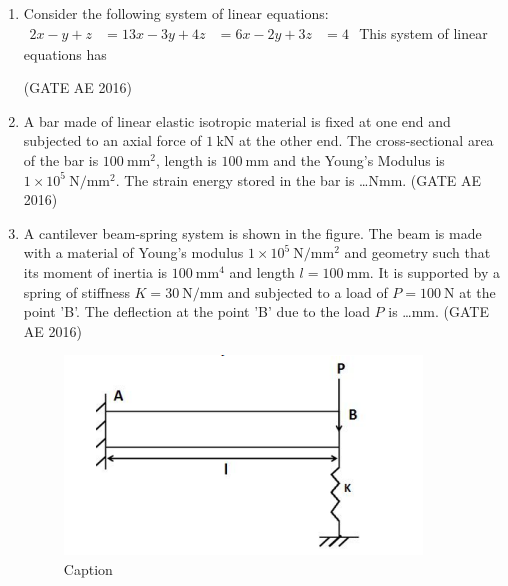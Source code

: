 \documentclass[journal,12pt,onecolumn]{IEEEtran}
\theoremstyle{remark}
\begin{document}
\begin{enumerate}
\item Consider the following system of linear equations:
$
\begin{aligned}
2x - y + z &= 1 
3x - 3y + 4z &= 6 
x - 2y + 3z &= 4
\end{aligned}
$
This system of linear equations has
\begin{enumerate}
\end{enumerate}
\hfill(GATE AE 2016)



\item A bar made of linear elastic isotropic material is fixed at one end and subjected to an axial force of $1~\mathrm{kN}$ at the other end. The cross-sectional area of the bar is $100~\mathrm{mm^2}$, length is $100~\mathrm{mm}$ and the Young's Modulus is $1 \times 10^5~\mathrm{N/mm^2}$. The strain energy stored in the bar is \dots Nmm.
\hfill(GATE AE 2016)



\item A cantilever beam-spring system is shown in the figure. The beam is made with a material of Young's modulus $1\times10^5~\mathrm{N/mm^2}$ and geometry such that its moment of inertia is $100~\mathrm{mm^4}$ and length $l = 100~\mathrm{mm}$. It is supported by a spring of stiffness $K = 30~\mathrm{N/mm}$ and subjected to a load of $P = 100~\mathrm{N}$ at the point 'B'. The deflection at the point 'B' due to the load $P$ is \dots mm.
\hfill(GATE AE 2016)

\begin{figure}[H]
    \centering
    \includegraphics[width=0.5\columnwidth]{figs/Screenshot from 2025-08-16 11-44-28.png}
    \caption{Caption}
    \label{fig:placeholder}
\end{figure}




\end{enumerate}
\end{document}
